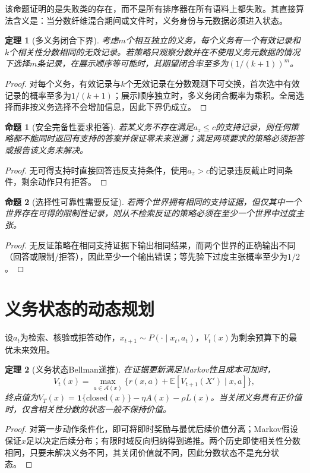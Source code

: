 \documentclass[12pt,openright]{ctexbook}
\newtheorem{proposition}{命题}[chapter]
\newtheorem{theorem}{定理}[chapter]
\begin{document}
该命题证明的是失败类的存在，而不是所有排序器在所有语料上都失败。其直接算法含义是：当分数纤维混合期间或文件时，义务身份与元数据必须进入状态。

\begin{theorem}[多义务闭合下界]
考虑$m$个相互独立的义务，每个义务有一个有效记录和$k$个相关性分数相同的无效记录。若策略只观察分数并在不使用义务元数据的情况下选择$m$条记录，在展示顺序等可能时，其期望闭合率至多为$(1/(k+1))^m$。
\end{theorem}
\begin{proof}
对每个义务，有效记录与$k$个无效记录在分数观测下可交换，首次选中有效记录的概率至多为$1/(k+1)$；展示顺序独立时，多义务闭合概率为乘积。全局选择而非按义务选择不会增加信息，因此下界仍成立。
\end{proof}

\begin{proposition}[安全完备性要求拒答]
若某义务不存在满足$a_z\le c$的支持记录，则任何策略都不能同时返回有支持的答案并保证零未来泄漏；满足两项要求的策略必须拒答或报告该义务未解决。
\end{proposition}
\begin{proof}
无可得支持时直接回答违反支持条件，使用$a_z>c$的记录违反截止时间条件，剩余动作只有拒答。
\end{proof}

\begin{proposition}[选择性可靠性需要反证]
若两个世界拥有相同的支持证据，但仅其中一个世界存在可得的限制性记录，则从不检索反证的策略必须在至少一个世界中过度主张。
\end{proposition}
\begin{proof}
无反证策略在相同支持证据下输出相同结果，而两个世界的正确输出不同（回答或限制/拒答），因此至少一个输出错误；等先验下过度主张概率至少为$1/2$。
\end{proof}

\section{义务状态的动态规划}
设$a_t$为检索、核验或拒答动作，$x_{t+1}\sim P(\cdot\mid x_t,a_t)$，$V_t(x)$为剩余预算下的最优未来效用。
\begin{theorem}[义务状态Bellman递推]
在证据更新满足Markov性且成本可加时，
\[
 V_t(x)=\max_{a\in\mathcal A(x)}\{r(x,a)+\mathbb E[V_{t+1}(X')\mid x,a]\},
\]
终点值为$V_T(x)=\mathbf 1\{\mathrm{closed}(x)\}-\eta A(x)-\rho L(x)$。当关闭义务具有正价值时，仅含相关性分数的状态一般不保持价值。
\end{theorem}
\begin{proof}
对第一步动作条件化，即可将即时奖励与最优后续价值分离；Markov假设保证$x$足以决定后续分布；有限时域反向归纳得到递推。两个历史即使相关性分数相同，只要未解决义务不同，其关闭价值就不同，因此分数状态不是充分状态。
\end{proof}
\end{document}

